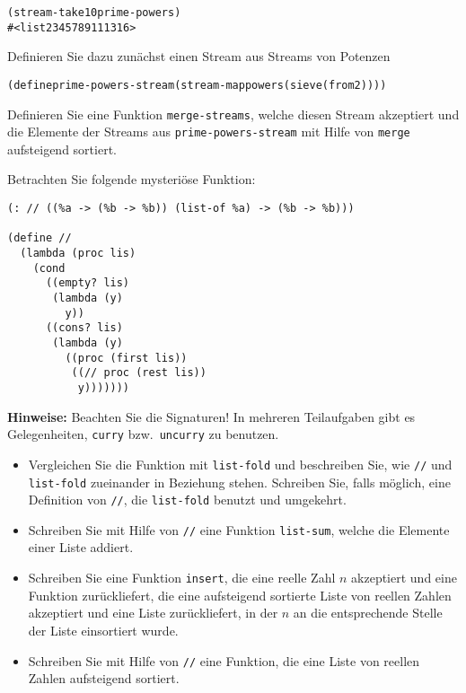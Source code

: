 \begin{aufgabe}
\begin{enumerate}
     \begin{alltt}
(stream-take 10 prime-powers)
\evalsto{} #<list 2 3 4 5 7 8 9 11 13 16>
     \end{alltt}
     Definieren Sie dazu zunächst einen Stream aus Streams von Potenzen
     \begin{alltt}
(define prime-powers-stream (stream-map powers (sieve (from 2))))
     \end{alltt}
     Definieren Sie eine Funktion \texttt{merge-streams}, welche
     diesen Stream akzeptiert und die Elemente der Streams
     aus \texttt{prime-powers-stream} mit Hilfe von \texttt{merge}
     aufsteigend sortiert.
   \end{enumerate}
 \end{aufgabe}

 \begin{aufgabe}
  Betrachten Sie folgende mysteriöse Funktion:
\begin{verbatim}
(: // ((%a -> (%b -> %b)) (list-of %a) -> (%b -> %b)))

(define //
  (lambda (proc lis)
    (cond
      ((empty? lis)
       (lambda (y)
         y))
      ((cons? lis)
       (lambda (y)
         ((proc (first lis))
          ((// proc (rest lis))
           y)))))))
\end{verbatim}
  \textbf{Hinweise:} Beachten Sie die Signaturen! In mehreren
  Teilaufgaben gibt es Gelegenheiten, \texttt{curry} bzw.\
  \texttt{uncurry} zu benutzen.

  \begin{itemize}
  \item Vergleichen Sie die Funktion mit \texttt{list-fold} und
    beschreiben Sie, wie \texttt{//} und \texttt{list-fold} zueinander
    in Beziehung stehen.  Schreiben Sie, falls möglich, eine
    Definition von \texttt{//}, die \texttt{list-fold} benutzt und
    umgekehrt.
  \item Schreiben Sie mit Hilfe von \texttt{//} eine Funktion
    \texttt{list-sum}, welche die Elemente einer Liste addiert.
  \item Schreiben Sie eine Funktion \texttt{insert}, die eine reelle
    Zahl $n$ akzeptiert und eine Funktion zurückliefert, die eine
    aufsteigend sortierte Liste von reellen Zahlen akzeptiert und
    eine Liste zurückliefert, in der $n$ an die entsprechende
    Stelle der Liste einsortiert wurde.
  \item Schreiben Sie mit Hilfe von \texttt{//} eine Funktion, die
    eine Liste von reellen Zahlen aufsteigend sortiert.
  \end{itemize}
\end{aufgabe}

